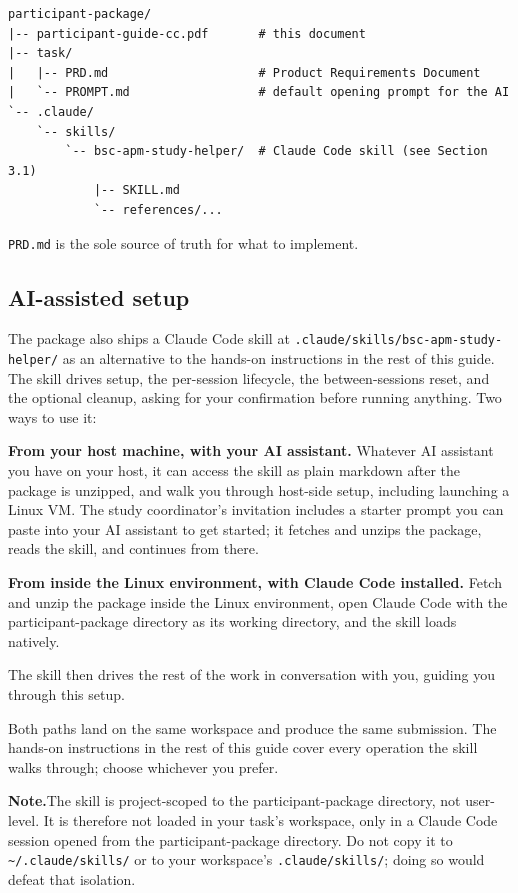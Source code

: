\documentclass[11pt, a4paper]{article}
\newcommand{\note}[1]{%
    \begin{mdframed}[linecolor=noteborder]
    \textbf{\textcolor{noteborder}{Note.}}\enspace #1
    \end{mdframed}%
}
\begin{document}
\begin{verbatim}
participant-package/
|-- participant-guide-cc.pdf       # this document
|-- task/
|   |-- PRD.md                     # Product Requirements Document
|   `-- PROMPT.md                  # default opening prompt for the AI
`-- .claude/
    `-- skills/
        `-- bsc-apm-study-helper/  # Claude Code skill (see Section 3.1)
            |-- SKILL.md
            `-- references/...
\end{verbatim}

\texttt{PRD.md} is the sole source of truth for what to implement.

\subsection{AI-assisted setup}
\label{sec:aiassist}

The package also ships a Claude Code skill at \texttt{.claude/skills/bsc-apm-study-helper/} as an alternative to the hands-on instructions in the rest of this guide. The skill drives setup, the per-session lifecycle, the between-sessions reset, and the optional cleanup, asking for your confirmation before running anything. Two ways to use it:

\textbf{From your host machine, with your AI assistant.} Whatever AI assistant you have on your host, it can access the skill as plain markdown after the package is unzipped, and walk you through host-side setup, including launching a Linux VM. The study coordinator's invitation includes a starter prompt you can paste into your AI assistant to get started; it fetches and unzips the package, reads the skill, and continues from there.

\textbf{From inside the Linux environment, with Claude Code installed.} Fetch and unzip the package inside the Linux environment, open Claude Code with the participant-package directory as its working directory, and the skill loads natively.

The skill then drives the rest of the work in conversation with you, guiding you through this setup.

Both paths land on the same workspace and produce the same submission. The hands-on instructions in the rest of this guide cover every operation the skill walks through; choose whichever you prefer.

\note{The skill is project-scoped to the participant-package directory, not user-level. It is therefore not loaded in your task's workspace, only in a Claude Code session opened from the participant-package directory. Do not copy it to \texttt{\textasciitilde/.claude/skills/} or to your workspace's \texttt{.claude/skills/}; doing so would defeat that isolation.}
\end{document}
